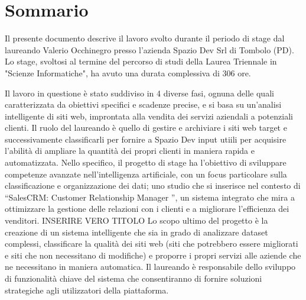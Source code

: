 \cleardoublepage
{}
{}
\begingroup
\let\clearpage\relax
\let\cleardoublepage\relax
\let\cleardoublepage\relax

\chapter*{Sommario}

Il presente documento descrive il lavoro svolto durante il periodo di stage dal laureando
Valerio Occhinegro presso l’azienda Spazio Dev Srl di Tombolo (PD). Lo stage, svoltosi al termine del percorso di studi della Laurea Triennale in "Scienze Informatiche", ha avuto una durata complessiva di 306 ore.

Il lavoro in questione è stato suddiviso in 4 diverse fasi, ognuna delle quali caratterizzata da obiettivi specifici e scadenze precise, e si basa su un'analisi intelligente di siti web, improntata alla vendita dei servizi aziendali a potenziali clienti. Il ruolo del laureando è quello di gestire e archiviare i siti web target e successivamente classificarli per fornire a Spazio Dev input utiili per acquisire l'abilità di ampliare la quantità dei propri clienti in maniera rapida e automatizzata. 
Nello specifico, il progetto di stage ha l’obiettivo di sviluppare competenze avanzate nell’intelligenza artificiale, con un focus
particolare sulla classificazione e organizzazione dei dati; uno studio che si inserisce nel contesto di
{“SalesCRM: Customer Relationship Manager ”, un sistema integrato che mira a ottimizzare la gestione delle relazioni con i clienti e a migliorare l’efficienza dei venditori.} INSERIRE VERO TITOLO
Lo scopo ultimo del progetto è la creazione di un sistema intelligente che sia in grado di analizzare dataset complessi,
classificare la qualità dei siti web (siti che potrebbero essere migliorati e siti che non necessitano di modifiche) e proporre i propri servizi alle aziende che ne necessitano in maniera automatica. 
Il laureando è responsabile dello sviluppo di funzionalità chiave del sistema che consentiranno di fornire
soluzioni strategiche agli utilizzatori della piattaforma. 






\endgroup

\vfill
